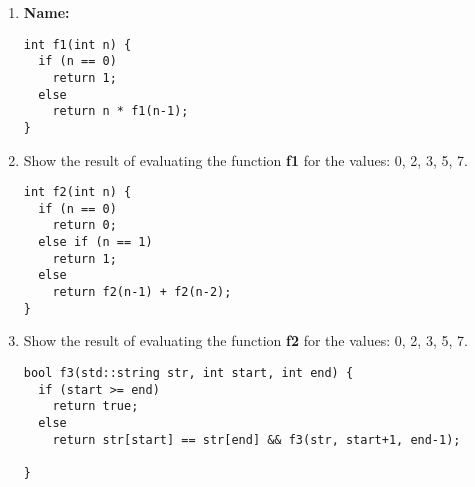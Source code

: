 \documentclass{article}
\begin{document}
\begin{spacing}{1.1}

\begin{enumerate}[leftmargin=*]

\item \textbf{Name:} \hrulefill

\vspace{.4cm}


\begin{lstlisting}
int f1(int n) {
  if (n == 0)
    return 1;
  else
    return n * f1(n-1);
}
\end{lstlisting}

  
\item Show the result of evaluating the function \textbf{f1} for the
  values: 0, 2, 3, 5, 7.

\vspace{4cm}


\begin{lstlisting}
int f2(int n) {
  if (n == 0)
    return 0;
  else if (n == 1)
    return 1;
  else
    return f2(n-1) + f2(n-2);
}
\end{lstlisting}

\item Show the result of evaluating the function \textbf{f2} for the
  values: 0, 2, 3, 5, 7.


\newpage


\begin{lstlisting}
bool f3(std::string str, int start, int end) {
  if (start >= end)
    return true;
  else
    return str[start] == str[end] && f3(str, start+1, end-1);

}
\end{lstlisting}



\end{enumerate}
\end{spacing}
\end{document}
